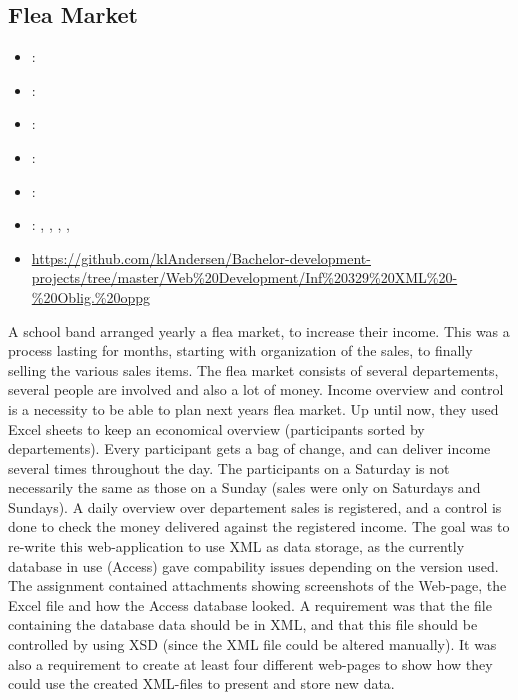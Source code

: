 \subsection{Flea Market}
\label{sec:flea_market}
\begin{itemize} 
	\item {}: 
	\item {}: 
	\item {}: 
	\item {}: 
	\item {}: 
	\item {}: , , , , 
	\item {} \url{https://github.com/klAndersen/Bachelor-development-projects/tree/master/Web%20Development/Inf%20329%20XML%20-%20Oblig.%20oppg}
\end{itemize} 
A school band arranged yearly a flea market, to increase their income. 
This was a process lasting for months, starting with organization of the sales, to finally selling the various sales items. 
The flea market consists of several departements, several people are involved and also a lot of money.
Income overview and control is a necessity to be able to plan next years flea market. 
Up until now, they used Excel sheets to keep an economical overview (participants sorted by departements).
Every participant gets a bag of change, and can deliver income several times throughout the day.
The participants on a Saturday is not necessarily the same as those on a Sunday (sales were only on Saturdays and Sundays). 
A daily overview over departement sales is registered, and a control is done to check the money delivered against the registered income.
\vspace{0.5em}\newline
The goal was to re-write this web-application to use XML as data storage, as the currently database in use (Access) gave compability issues depending on the version used. 
The assignment contained attachments showing screenshots of the Web-page, the Excel file and how the Access database looked. 
A requirement was that the file containing the database data should be in XML, and that this file should be controlled by using XSD (since the XML file could be altered manually).
It was also a requirement to create at least four different web-pages to show how they could use the created XML-files to present and store new data.

